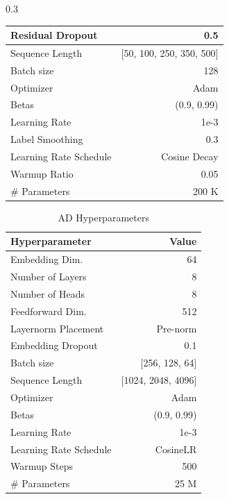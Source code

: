\documentclass{article}
\begin{document}
\begin{table}[h!]
\begin{subtable}[h]{0.3\textwidth}
{\begin{tabular}{@{}lr@{}}
    Residual Dropout                & 0.5 \\
    \midrule
    Sequence Length                 & {[}50, 100, 250, 350, 500{]} \\
    \midrule
    Batch size                      & 128 \\
    Optimizer                       & Adam \\
    Betas                           & (0.9, 0.99) \\
    Learning Rate                   & 1e-3 \\
    Label Smoothing                 & 0.3 \\
    \bottomrule
    Learning Rate Schedule          & Cosine Decay \\
    Warmup Ratio                    & 0.05 \\
    \# Parameters                   & 200 K \\    
    \bottomrule
    \end{tabular}
    }
\end{subtable}
\end{table}

\begin{table}[h!]
\centering
\caption{AD Hyperparameters}
\label{tab:ad-hyper}
\begin{tabular}{@{}lr@{}}
\toprule
\textbf{Hyperparameter} & \textbf{Value} \\ \midrule
Embedding Dim. & 64 \\
Number of Layers & 8 \\
Number of Heads & 8 \\
Feedforward Dim. & 512 \\
Layernorm Placement & Pre-norm \\
Embedding Dropout & 0.1 \\ \midrule
Batch size & {[}256, 128, 64{]} \\
Sequence Length & {[}1024, 2048, 4096{]} \\ \midrule
Optimizer & Adam \\
Betas & (0.9, 0.99) \\
Learning Rate & 1e-3 \\ \midrule
Learning Rate Schedule & CosineLR \\
Warmup Steps & 500 \\
\# Parameters & 25 M \\
\bottomrule
\end{tabular}
\end{table}
\end{document}
